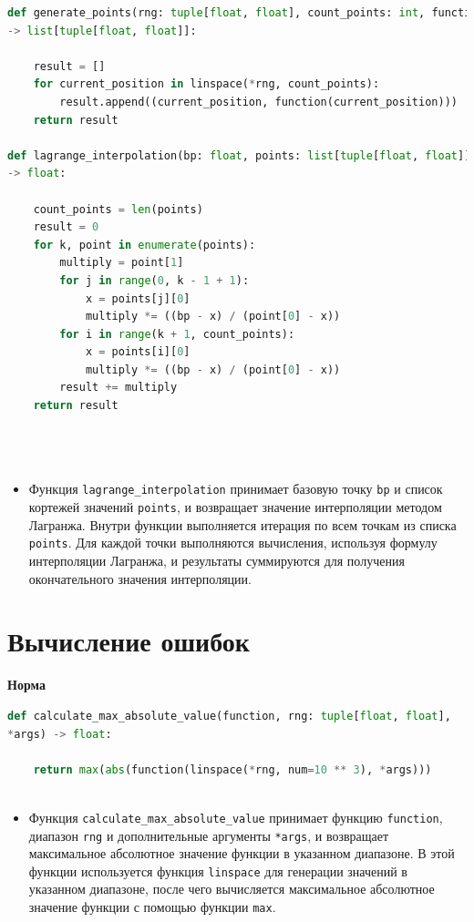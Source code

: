 \documentclass{article}
\begin{document}
\begin{lstlisting}[language=Python]
def generate_points(rng: tuple[float, float], count_points: int, function)
-> list[tuple[float, float]]:
    
    result = []
    for current_position in linspace(*rng, count_points):
        result.append((current_position, function(current_position)))
    return result

def lagrange_interpolation(bp: float, points: list[tuple[float, float]]) 
-> float:
    
    count_points = len(points)
    result = 0
    for k, point in enumerate(points):
        multiply = point[1]
        for j in range(0, k - 1 + 1):
            x = points[j][0]
            multiply *= ((bp - x) / (point[0] - x))
        for i in range(k + 1, count_points):
            x = points[i][0]
            multiply *= ((bp - x) / (point[0] - x))
        result += multiply
    return result


    
\end{lstlisting}

\begin{itemize}
\item Функция \texttt{lagrange\_interpolation} принимает базовую точку \texttt{bp} и список кортежей значений \texttt{points}, и возвращает значение интерполяции методом Лагранжа. Внутри функции выполняется итерация по всем точкам из списка \texttt{points}. Для каждой точки выполняются вычисления, используя формулу интерполяции Лагранжа, и результаты суммируются для получения окончательного значения интерполяции. 
\end{itemize}

\section{Вычисление ошибок}
\textbf{\large{Норма}}

\begin{lstlisting}[language=Python]
def calculate_max_absolute_value(function, rng: tuple[float, float],
*args) -> float:

    return max(abs(function(linspace(*rng, num=10 ** 3), *args)))
    
\end{lstlisting}

\begin{itemize}
\item Функция \texttt{calculate\_max\_absolute\_value} принимает функцию \texttt{function}, диапазон \texttt{rng} и дополнительные аргументы \texttt{*args}, и возвращает максимальное абсолютное значение функции в указанном диапазоне. В этой функции используется функция \texttt{linspace} для генерации значений в указанном диапазоне, после чего вычисляется максимальное абсолютное значение функции с помощью функции \texttt{max}.
\end{itemize}
\end{document}
